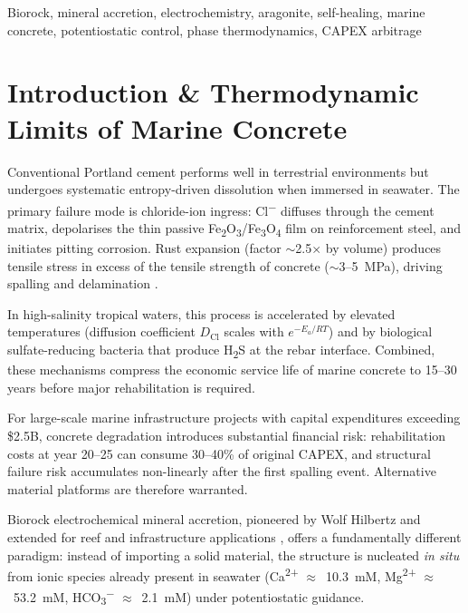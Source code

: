 \documentclass[journal,twocolumn]{IEEEtran}
\begin{document}
\begin{IEEEkeywords}
Biorock, mineral accretion, electrochemistry, aragonite, self-healing, marine concrete, potentiostatic control, phase thermodynamics, CAPEX arbitrage
\end{IEEEkeywords}

\section{Introduction \& Thermodynamic Limits of Marine Concrete}

Conventional Portland cement performs well in terrestrial environments but undergoes systematic entropy-driven dissolution when immersed in seawater. The primary failure mode is chloride-ion ingress: Cl\textsuperscript{$-$} diffuses through the cement matrix, depolarises the thin passive Fe\textsubscript{2}O\textsubscript{3}/Fe\textsubscript{3}O\textsubscript{4} film on reinforcement steel, and initiates pitting corrosion. Rust expansion (factor $\sim$2.5$\times$ by volume) produces tensile stress in excess of the tensile strength of concrete ($\sim$3--5~MPa), driving spalling and delamination \cite{mehta1991}.

In high-salinity tropical waters, this process is accelerated by elevated temperatures (diffusion coefficient $D_{\mathrm{Cl}}$ scales with $e^{-E_a/RT}$) and by biological sulfate-reducing bacteria that produce H\textsubscript{2}S at the rebar interface. Combined, these mechanisms compress the economic service life of marine concrete to 15--30 years before major rehabilitation is required.

For large-scale marine infrastructure projects with capital expenditures exceeding \$2.5B, concrete degradation introduces substantial financial risk: rehabilitation costs at year 20--25 can consume 30--40\% of original CAPEX, and structural failure risk accumulates non-linearly after the first spalling event. Alternative material platforms are therefore warranted.

Biorock electrochemical mineral accretion, pioneered by Wolf Hilbertz \cite{hilbertz1979} and extended for reef and infrastructure applications \cite{goreau2012}, offers a fundamentally different paradigm: instead of importing a solid material, the structure is nucleated \textit{in situ} from ionic species already present in seawater (Ca\textsuperscript{2+} $\approx$~10.3~mM, Mg\textsuperscript{2+} $\approx$~53.2~mM, HCO\textsubscript{3}\textsuperscript{$-$} $\approx$~2.1~mM) under potentiostatic guidance.
\end{document}
